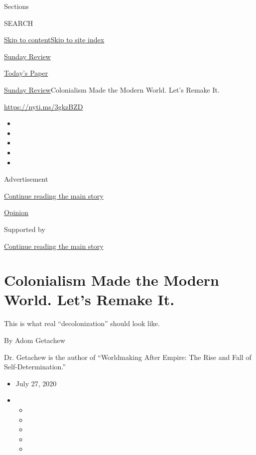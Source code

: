 Sections

SEARCH

\protect\hyperlink{site-content}{Skip to
content}\protect\hyperlink{site-index}{Skip to site index}

\href{https://www.nytimes.com/section/opinion/sunday}{Sunday Review}

\href{https://myaccount.nytimes.com/auth/login?response_type=cookie\&client_id=vi}{}

\href{https://www.nytimes.com/section/todayspaper}{Today's Paper}

\href{/section/opinion/sunday}{Sunday Review}\textbar{}Colonialism Made
the Modern World. Let's Remake It.

\url{https://nyti.ms/3gkzBZD}

\begin{itemize}
\item
\item
\item
\item
\item
\end{itemize}

Advertisement

\protect\hyperlink{after-top}{Continue reading the main story}

\href{/section/opinion}{Opinion}

Supported by

\protect\hyperlink{after-sponsor}{Continue reading the main story}

\hypertarget{colonialism-made-the-modern-world-lets-remake-it}{%
\section{Colonialism Made the Modern World. Let's Remake
It.}\label{colonialism-made-the-modern-world-lets-remake-it}}

This is what real ``decolonization'' should look like.

By Adom Getachew

Dr. Getachew is the author of ``Worldmaking After Empire: The Rise and
Fall of Self-Determination.''

\begin{itemize}
\item
  July 27, 2020
\item
  \begin{itemize}
  \item
  \item
  \item
  \item
  \item
  \end{itemize}
\end{itemize}

